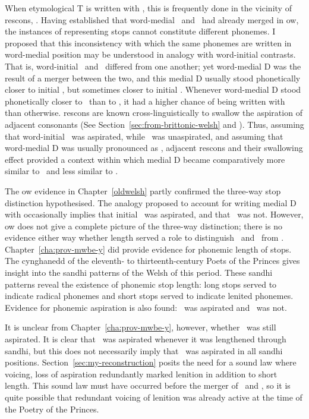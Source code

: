 When etymological \gls{T} is written with , this is frequently done in the vicinity of \gls{rescon}s, \ie {}. Having established that word-medial \xD\ and \lT\ had already merged in \gls{ow}, the instances of  representing stops cannot constitute different phonemes. I proposed that this inconsistency with which the same phonemes are written in word-medial position may be understood in analogy with word-initial contrasts. That is, word-initial \lT\ and \xD\ differed from one another; yet word-medial \gls{D} was the result of a merger between the two, and this medial \gls{D} usually stood phonetically closer to initial \lT, but sometimes closer to initial \xD. Whenever word-medial \gls{D} stood phonetically closer to \xD\ than to \lT, it had a higher chance of being written with  than otherwise. \Gls{rescon}s are known cross-linguistically to swallow the aspiration of adjacent consonants (See Section~\ref{sec:from-brittonic-welsh} and \textcite{koch_*cothairche_1990}). Thus, assuming that word-initial \lT\ was aspirated, while \xD\ was unaspirated, and assuming that word-medial \gls{D} was usually pronounced as \lT, adjacent \gls{rescon}s and their swallowing effect provided a context within which medial \gls{D} became comparatively more similar to \xD\ and less similar to \lT.

The \gls{ow} evidence in Chapter~\ref{oldwelsh} partly confirmed the three-way stop distinction hypothesised. The analogy proposed to account for writing medial \gls{D} with  occasionally implies that initial \lT\ was aspirated, and that \xD\ was not. However, \gls{ow} does not give a complete picture of the three-way distinction; there is no evidence either way whether length served a role to distinguish \xT\ and \xD\ from \lT.
Chapter~\ref{cha:prov-mwbe-y} did provide evidence for phonemic length of stops. The cynghanedd of the eleventh- to thirteenth-century Poets of the Princes gives insight into the \gls{sandhi} patterns of the Welsh of this period. These \gls{sandhi} patterns reveal the existence of phonemic stop length: long stops served to indicate radical phonemes and short stops served to indicate lenited phonemes. Evidence for phonemic aspiration is also found: \xT\ was aspirated and \xD\ was not.

It is unclear from Chapter~\ref{cha:prov-mwbe-y}, however, whether \lT\ was still aspirated. It is clear that \lT\ was aspirated whenever it was lengthened through \gls{sandhi}, but this does not necessarily imply that \lT\ was aspirated in all \gls{sandhi} positions. Section~\ref{sec:my-reconstruction} posits the need for a sound law where voicing, \ie loss of aspiration redundantly marked lenition in addition to short length. This sound law must have occurred before the merger of \lT\ and \xD, so it is quite possible that redundant voicing of lenition was already active at the time of the Poetry of the Princes.

